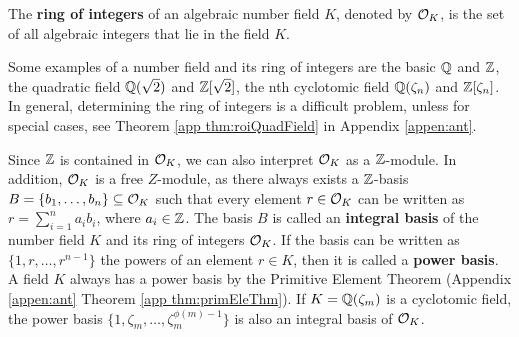 \documentclass[../main.tex]{subfiles}
\begin{document}
\begin{definition}
\reversemarginpar
{}
The \textbf{ring of integers} of an algebraic number field $K$, denoted by $\mathcal{O}_K$, is the set of all algebraic integers that lie in the field $K$. 
\end{definition}

Some examples of a number field and its ring of integers are the basic $\mathbb{Q}$ and $\mathbb{Z}$, the quadratic field $\mathbb{Q}(\sqrt{2})$ and $\mathbb{Z}[\sqrt{2}]$, the nth cyclotomic field $\mathbb{Q}(\zeta_n)$ and $\mathbb{Z}[\zeta_n]$. In general, determining the ring of integers is a difficult problem, unless for special cases, see Theorem \ref{app thm:roiQuadField} in Appendix \ref{appen:ant}. 


Since $\mathbb{Z}$ is contained in $\mathcal{O}_K$, we can also interpret $\mathcal{O}_K$ as a $\mathbb{Z}$-module. In addition,  
\reversemarginpar
{}
$\mathcal{O}_K$ is a free $Z$-module, as there always exists a $\mathbb{Z}$-basis $B=\{b_1, \dots, b_n\} \subseteq \mathcal{O}_K$ such that every element $r \in \mathcal{O}_K$ can be written as $r=\sum_{i=1}^n a_i b_i$, where $a_i \in \mathbb{Z}$. 
The basis $B$ is called an \textbf{integral basis} 
\reversemarginpar
{}
of the number field $K$ and its ring of integers $\mathcal{O}_K$.
If the basis can be written as $\{1,r,\dots,r^{n-1}\}$ the powers of an element $r \in K$, then it is called a \textbf{power basis}. A field $K$ always has a power basis by the Primitive Element Theorem (Appendix \ref{appen:ant} Theorem \ref{app thm:primEleThm}). %
If $K=\mathbb{Q}(\zeta_m)$ is a cyclotomic field, the power basis $\{1, \zeta_m, \dots, \zeta_m^{\phi(m)-1}\}$ is also an integral basis of $\mathcal{O}_K$. 
\end{document}
